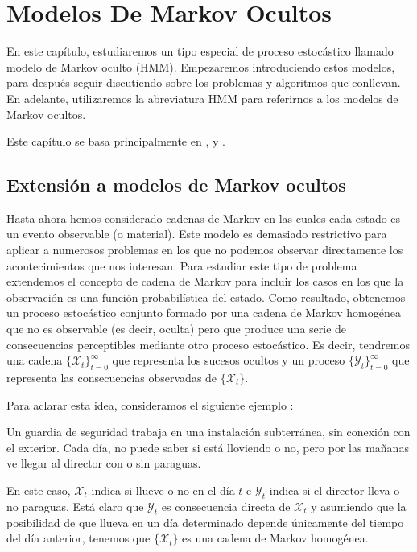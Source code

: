 \chapter{Modelos De Markov Ocultos}

En este capítulo, estudiaremos un tipo especial de proceso estocástico llamado modelo de Markov oculto (HMM). Empezaremos introduciendo estos modelos, para después seguir discutiendo sobre los problemas y algoritmos que conllevan. En adelante, utilizaremos la abreviatura HMM para referirnos a los modelos de Markov ocultos. 

Este capítulo se basa principalmente en \cite{Rabiner}, \cite[Capítulo 2]{Stamp} y \cite{Jurafsky}.
\section{Extensión a modelos de Markov ocultos }
Hasta ahora hemos considerado cadenas de Markov en las cuales cada estado es un evento observable (o material). Este modelo es demasiado restrictivo para aplicar a numerosos problemas en los que no podemos observar directamente los acontecimientos que nos interesan. Para estudiar este tipo de problema extendemos el concepto de cadena de Markov para incluir los casos en los que la observación es una función probabilística del estado. Como resultado, obtenemos un proceso estocástico conjunto formado por una cadena de Markov homogénea que no es observable (es decir, oculta) pero que produce una serie de consecuencias perceptibles mediante otro proceso estocástico. Es decir, tendremos una cadena $\{\mathcal{X}_t\}_{t=0}^{\infty}$ que representa los sucesos ocultos y un proceso $\{\mathcal{Y}_t\}_{t=0}^{\infty}$ que representa las consecuencias observadas de $\{\mathcal{X}_t\}$. 

Para aclarar esta idea, consideramos el siguiente ejemplo \cite{Russell}:
\begin{exampleth}\label{ejemplo_paraguas}
Un guardia de seguridad trabaja en una instalación subterránea, sin conexión con el exterior. Cada día, no puede saber si está lloviendo o no, pero por las mañanas ve llegar al director con o sin paraguas.

En este caso, $\mathcal{X}_t$ indica si llueve o no en el día $t$ e $\mathcal{Y}_t$ indica si el director lleva o no paraguas. Está claro que $\mathcal{Y}_t$ es consecuencia directa de $\mathcal{X}_t$ y asumiendo que la posibilidad de que llueva en un día determinado depende únicamente del tiempo del día anterior, tenemos que $\{\mathcal{X}_t\}$ es una cadena de Markov homogénea.
\end{exampleth}

